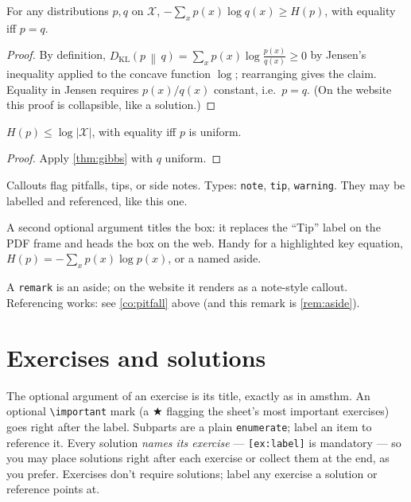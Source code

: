 \documentclass[11pt]{article}
\newcommand{\KL}[2]{D_{\mathrm{KL}}\!\left(#1 \,\middle\|\, #2\right)}
\begin{document}
\begin{theorem}
\label{thm:gibbs}
For any distributions $p, q$ on $\mathcal{X}$,
$-\sum_x p(x) \log q(x) \geq H(p)$, with equality iff $p = q$.
\end{theorem}

\begin{proof}
By definition, $\KL{p}{q} = \sum_x p(x) \log \frac{p(x)}{q(x)} \geq 0$ by
Jensen's inequality applied to the concave function $\log$; rearranging gives
the claim. Equality in Jensen requires $p(x)/q(x)$ constant, i.e.\ $p = q$.
(On the website this proof is collapsible, like a solution.)
\end{proof}

\begin{lemma}
\label{lem:uniform}
$H(p) \leq \log |\mathcal{X}|$, with equality iff $p$ is uniform.
\end{lemma}

\begin{proof}
Apply \cref{thm:gibbs} with $q$ uniform.
\end{proof}

\begin{callout}[warning]
\label{co:pitfall}
Callouts flag pitfalls, tips, or side notes. Types: \texttt{note},
\texttt{tip}, \texttt{warning}. They may be labelled and referenced,
like this one.
\end{callout}

\begin{callout}
A second optional argument titles the box: it replaces the ``Tip'' label on
the PDF frame and heads the box on the web. Handy for a highlighted key
equation, \(H(p) = -\sum_x p(x) \log p(x)\), or a named aside.
\end{callout}

\begin{remark}
\label{rem:aside}
A \texttt{remark} is an aside; on the website it renders as a note-style
callout. Referencing works: see \cref{co:pitfall} above (and this remark is
\cref{rem:aside}).
\end{remark}

\section{Exercises and solutions}
\label{sec:exercises}

The optional argument of an exercise is its title, exactly as in amsthm.
An optional \verb|\important| mark (a $\bigstar$ flagging the sheet's most
important exercises) goes right after the label. Subparts are a plain
\texttt{enumerate}; label an item to reference it. Every solution
\emph{names its exercise} — \texttt{[ex:label]} is mandatory — so you may
place solutions right after each exercise or collect them at the end, as you
prefer. Exercises don't require solutions; label any exercise a solution or
reference points at.
\end{document}
